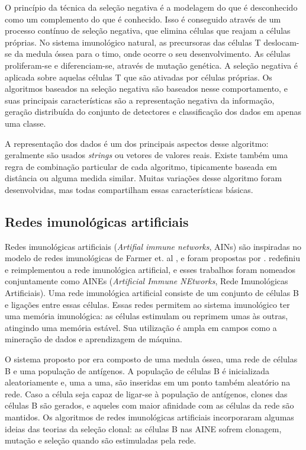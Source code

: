  O princípio da técnica da seleção negativa é a modelagem do que é desconhecido como um complemento do que é conhecido. Isso é conseguido através de um processo contínuo de seleção negativa, que elimina células que reajam a células próprias. No sistema imunológico natural, as precursoras das células T deslocam-se da medula óssea para o timo, onde ocorre o seu desenvolvimento. As células proliferam-se e diferenciam-se, através de mutação genética. A seleção negativa é aplicada sobre aquelas células T que são ativadas por células próprias. Os algoritmos baseados na seleção negativa são baseados nesse comportamento, e suas principais características são a representação negativa da informação, geração distribuída do conjunto de detectores e classificação dos dados em apenas uma classe.

A representação dos dados é um dos principais aspectos desse algoritmo: geralmente são usados \emph{strings} ou vetores de valores reais. Existe também uma regra de combinação particular de cada algoritmo, tipicamente baseada em distância ou alguma medida similar. Muitas variações desse algoritmo foram desenvolvidas, mas todas compartilham essas características básicas.

\subsection{Redes imunológicas artificiais}

Redes imunológicas artificiais (\emph{Artifial immune networks}, AINs) são inspiradas no modelo de redes imunológicas de Farmer et. al \cite{Farmer1986}, e foram propostas por \cite{Ishida1990}. \cite{Timmis2000} redefiniu e reimplementou a rede imunológica artificial, e esses trabalhos foram nomeados conjuntamente como AINEs (\emph{Artificial Immune NEtworks}, Rede Imunológicas Artificiais). Uma rede imunológica artificial consiste de um conjunto de células B e ligações entre essas células. Essas redes permitem ao sistema imunológico ter uma memória imunológica: as células estimulam ou reprimem umas às outras, atingindo uma memória estável. Sua utilização é ampla em campos como a mineração de dados e aprendizagem de máquina. 

O sistema proposto por \citeauthor{Timmis2000} era composto de uma medula óssea, uma rede de células B e uma população de antígenos. A população de células B é inicializada aleatoriamente e, uma a uma, são inseridas em um ponto também aleatório na rede. Caso a célula seja capaz de ligar-se à população de antígenos, clones das células B são gerados, e aqueles com maior afinidade com as células da rede são mantidos. Os algoritmos de redes imunológicas artificiais incorporaram algumas ideias das teorias da seleção clonal: as células B nas AINE sofrem clonagem, mutação e seleção quando são estimuladas pela rede.

